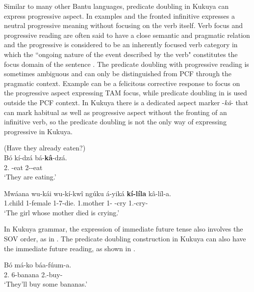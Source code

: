\documentclass[output=paper,colorlinks,citecolor=brown,
]{langscibook}
\begin{document}
Similar to many other Bantu languages, predicate doubling in Kukuya can express progressive aspect. In examples  and  the fronted infinitive expresses a neutral progressive meaning without focusing on the verb itself. Verb focus and progressive reading are often said to have a close semantic and pragmatic relation and the progressive is considered to be an inherently focused verb category in which the ``ongoing nature of the event described by the verb" constitutes the focus domain of the sentence \citep{HymanWatters1984, Güldemann2003, DeKind2014, DeKindEtAl2015}. The predicate doubling with progressive reading is sometimes ambiguous and can only be distinguished from PCF through the pragmatic context. Example  can be a felicitous corrective response to focus on the progressive aspect expressing TAM focus, while predicate doubling in  is used outside the PCF context. In Kukuya there is a dedicated aspect marker \mbox{-\textit{k\^{a}}-} that can mark habitual as well as progressive aspect without the fronting of an infinitive verb, so the predicate doubling is not the only way of expressing progressive in Kukuya.
\begin{exe}
\ex
\label{62}
 (Have they already eaten?)\\
\gll
Bó kí-dzá bá-\textbf{kâ}-dzá.\\
2.\Pro{} \Inf{}-eat 2\Sm{}-\Prog{}-eat\\
\trans ‘They are eating.’

\end{exe}
\begin{exe}
\ex
\label{63}
\gll
Mwáana wu-kái wu-kí-kwî ngúku á-yiká \textbf{kí-líla} kâ-líl-a.\\
1.child 1-female 1\Rel{}-7\Sm{}-die.\Pst{} 1.mother 1\Sm{}-\Impf{}  \Inf{}-cry 1\Sm{}.\Prog{}-cry-\Fv{}\\
\trans ‘The girl whose mother died is crying.’

\end{exe}
In Kukuya grammar, the expression of immediate future tense also involves the SOV order, as in . The predicate doubling construction in Kukuya can also have the immediate future reading, as shown in . 
\begin{exe}
\ex
\label{64}
\gll
Bó má-ko báa-fúum-a.\\
2.\Pro{}  6-banana 2\Sm{}.\Fut{}-buy-\Fv{}\\
\trans ‘They'll buy some bananas.’

\end{exe}
\end{document}
